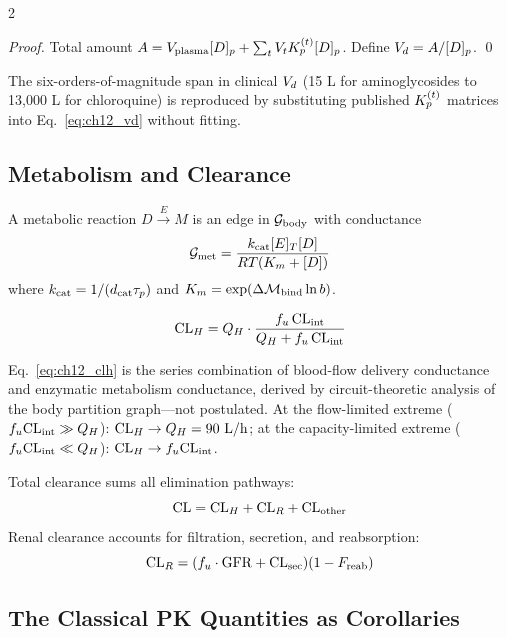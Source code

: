 \begin{multicols}{2}
\begin{proof}
Total amount $A = V_{\mathrm{plasma}}[D]_p + \sum_t V_tK_p^{(t)}[D]_p$. Define $V_d = A/[D]_p$. \qed
\end{proof}

The six-orders-of-magnitude span in clinical $V_d$ (15 L for aminoglycosides to 13{,}000 L for chloroquine) is reproduced by substituting published $K_p^{(t)}$ matrices into Eq.~\ref{eq:ch12_vd} without fitting.

\subsection{Metabolism and Clearance}

A metabolic reaction $D \xrightarrow{E} M$ is an edge in $\mathcal{G}_{\mathrm{body}}$ with conductance
\begin{equation}
\mathcal{G}_{\mathrm{met}} = \frac{k_{\mathrm{cat}}[E]_T[D]}{RT(K_m + [D])}
\label{eq:ch12_gmet}
\end{equation}
where $k_{\mathrm{cat}} = 1/(d_{\mathrm{cat}}\tau_p)$ and $K_m = \exp(\Delta\mathcal{M}_{\mathrm{bind}}\ln b)$.

\begin{theorem}
\label{thm:ch12_clh}
\begin{equation}
\mathrm{CL}_H = Q_H\cdot\frac{f_u\,\mathrm{CL}_{\mathrm{int}}}{Q_H + f_u\,\mathrm{CL}_{\mathrm{int}}}
\label{eq:ch12_clh}
\end{equation}
\end{theorem}

Eq.~\ref{eq:ch12_clh} is the series combination of blood-flow delivery conductance and enzymatic metabolism conductance, derived by circuit-theoretic analysis of the body partition graph---not postulated. At the flow-limited extreme ($f_u\mathrm{CL}_{\mathrm{int}} \gg Q_H$): $\mathrm{CL}_H \to Q_H = 90\ \mathrm{L/h}$; at the capacity-limited extreme ($f_u\mathrm{CL}_{\mathrm{int}} \ll Q_H$): $\mathrm{CL}_H \to f_u\mathrm{CL}_{\mathrm{int}}$.

Total clearance sums all elimination pathways:
\begin{equation}
\mathrm{CL} = \mathrm{CL}_H + \mathrm{CL}_R + \mathrm{CL}_{\mathrm{other}}
\label{eq:ch12_cltot}
\end{equation}
Renal clearance accounts for filtration, secretion, and reabsorption:
\begin{equation}
\mathrm{CL}_R = (f_u\cdot\mathrm{GFR} + \mathrm{CL}_{\mathrm{sec}})(1 - F_{\mathrm{reab}})
\label{eq:ch12_clr}
\end{equation}

\subsection{The Classical PK Quantities as Corollaries}


\end{multicols}
